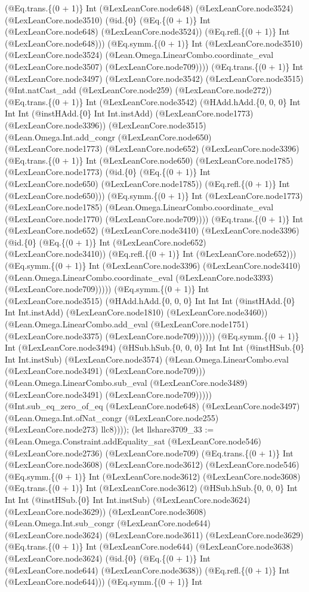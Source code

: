\documentclass[11pt]{article}
\begin{document}
(@Eq.trans.\{(0 + 1)\} Int (@LexLeanCore.node648) (@LexLeanCore.node3524) (@LexLeanCore.node3510) (@id.\{0\} (@Eq.\{(0 + 1)\} Int (@LexLeanCore.node648) (@LexLeanCore.node3524)) (@Eq.refl.\{(0 + 1)\} Int (@LexLeanCore.node648))) (@Eq.symm.\{(0 + 1)\} Int (@LexLeanCore.node3510) (@LexLeanCore.node3524) (@Lean.Omega.LinearCombo.coordinate\_eval (@LexLeanCore.node3507) (@LexLeanCore.node709)))) (@Eq.trans.\{(0 + 1)\} Int (@LexLeanCore.node3497) (@LexLeanCore.node3542) (@LexLeanCore.node3515) (@Int.natCast\_add (@LexLeanCore.node259) (@LexLeanCore.node272)) (@Eq.trans.\{(0 + 1)\} Int (@LexLeanCore.node3542) (@HAdd.hAdd.\{0, 0, 0\} Int Int Int (@instHAdd.\{0\} Int Int.instAdd) (@LexLeanCore.node1773) (@LexLeanCore.node3396)) (@LexLeanCore.node3515) (@Lean.Omega.Int.add\_congr (@LexLeanCore.node650) (@LexLeanCore.node1773) (@LexLeanCore.node652) (@LexLeanCore.node3396) (@Eq.trans.\{(0 + 1)\} Int (@LexLeanCore.node650) (@LexLeanCore.node1785) (@LexLeanCore.node1773) (@id.\{0\} (@Eq.\{(0 + 1)\} Int (@LexLeanCore.node650) (@LexLeanCore.node1785)) (@Eq.refl.\{(0 + 1)\} Int (@LexLeanCore.node650))) (@Eq.symm.\{(0 + 1)\} Int (@LexLeanCore.node1773) (@LexLeanCore.node1785) (@Lean.Omega.LinearCombo.coordinate\_eval (@LexLeanCore.node1770) (@LexLeanCore.node709)))) (@Eq.trans.\{(0 + 1)\} Int (@LexLeanCore.node652) (@LexLeanCore.node3410) (@LexLeanCore.node3396) (@id.\{0\} (@Eq.\{(0 + 1)\} Int (@LexLeanCore.node652) (@LexLeanCore.node3410)) (@Eq.refl.\{(0 + 1)\} Int (@LexLeanCore.node652))) (@Eq.symm.\{(0 + 1)\} Int (@LexLeanCore.node3396) (@LexLeanCore.node3410) (@Lean.Omega.LinearCombo.coordinate\_eval (@LexLeanCore.node3393) (@LexLeanCore.node709))))) (@Eq.symm.\{(0 + 1)\} Int (@LexLeanCore.node3515) (@HAdd.hAdd.\{0, 0, 0\} Int Int Int (@instHAdd.\{0\} Int Int.instAdd) (@LexLeanCore.node1810) (@LexLeanCore.node3460)) (@Lean.Omega.LinearCombo.add\_eval (@LexLeanCore.node1751) (@LexLeanCore.node3375) (@LexLeanCore.node709)))))) (@Eq.symm.\{(0 + 1)\} Int (@LexLeanCore.node3494) (@HSub.hSub.\{0, 0, 0\} Int Int Int (@instHSub.\{0\} Int Int.instSub) (@LexLeanCore.node3574) (@Lean.Omega.LinearCombo.eval (@LexLeanCore.node3491) (@LexLeanCore.node709))) (@Lean.Omega.LinearCombo.sub\_eval (@LexLeanCore.node3489) (@LexLeanCore.node3491) (@LexLeanCore.node709))))) (@Int.sub\_eq\_zero\_of\_eq (@LexLeanCore.node648) (@LexLeanCore.node3497) (@Lean.Omega.Int.ofNat\_congr (@LexLeanCore.node255) (@LexLeanCore.node273) llc8)))); (let llshare3709\_33 := (@Lean.Omega.Constraint.addEquality\_sat (@LexLeanCore.node546) (@LexLeanCore.node2736) (@LexLeanCore.node709) (@Eq.trans.\{(0 + 1)\} Int (@LexLeanCore.node3608) (@LexLeanCore.node3612) (@LexLeanCore.node546) (@Eq.symm.\{(0 + 1)\} Int (@LexLeanCore.node3612) (@LexLeanCore.node3608) (@Eq.trans.\{(0 + 1)\} Int (@LexLeanCore.node3612) (@HSub.hSub.\{0, 0, 0\} Int Int Int (@instHSub.\{0\} Int Int.instSub) (@LexLeanCore.node3624) (@LexLeanCore.node3629)) (@LexLeanCore.node3608) (@Lean.Omega.Int.sub\_congr (@LexLeanCore.node644) (@LexLeanCore.node3624) (@LexLeanCore.node3611) (@LexLeanCore.node3629) (@Eq.trans.\{(0 + 1)\} Int (@LexLeanCore.node644) (@LexLeanCore.node3638) (@LexLeanCore.node3624) (@id.\{0\} (@Eq.\{(0 + 1)\} Int (@LexLeanCore.node644) (@LexLeanCore.node3638)) (@Eq.refl.\{(0 + 1)\} Int (@LexLeanCore.node644))) (@Eq.symm.\{(0 + 1)\} Int 
\end{document}
